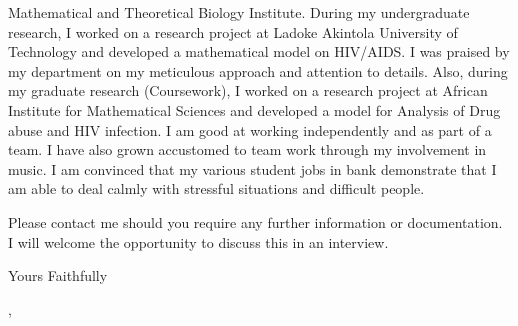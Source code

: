 \documentclass{letter} %
\begin{document}
\begin{letter}{Mathematical and Theoretical Biology Institute.}
\noindent During my undergraduate research, I worked on a research project at Ladoke Akintola University of Technology and developed a mathematical model on HIV/AIDS. I was praised by my department on my meticulous approach and attention to details. Also, during my graduate research (Coursework), I worked on a research project at African Institute for Mathematical Sciences and developed a model for Analysis of Drug abuse and HIV infection. I am good at working independently and as part of a team. I have also grown accustomed to team work through my involvement in  music. I am convinced that my various student jobs in bank demonstrate that I am able to deal calmly with stressful situations and difficult people.

Please contact me should you require any further information or documentation.
I will welcome the opportunity to discuss this in an interview.
\closing{Yours Faithfully},
\end{letter}
\end{document}
